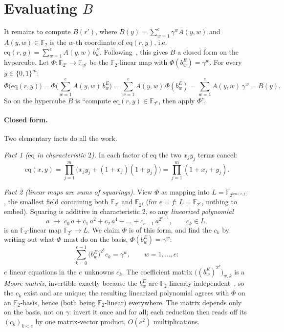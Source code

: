 \documentclass[11pt]{article}
\newcommand{\F}{\mathbb{F}}
\newcommand{\eq}{\mathrm{eq}}
\begin{document}
\section*{Evaluating $B$}
\label{section:eval_B}

It remains to compute $B(r')$, where $B(y)=\sum_{w=1}^e\gamma^w A(y,w)$ and $A(y,w)\in\F_2$ is the $w$-th coordinate of $\eq(r,y)$, i.e.\ $\eq(r,y)=\sum_{w=1}^e A(y,w)\,b^E_w$. Following~\cite{Flock}, this gives $B$ a closed form on the hypercube. Let $\Phi:\F_{2^e}\to\F_{2^f}$ be the $\F_2$-linear map with $\Phi(b^E_w)=\gamma^w$. For every $y\in\{0,1\}^m$:
\[
\Phi\big(\eq(r,y)\big)=\Phi\Big(\sum_{w=1}^e A(y,w)\,b^E_w\Big)=\sum_{w=1}^e A(y,w)\,\Phi(b^E_w)=\sum_{w=1}^e A(y,w)\,\gamma^w=B(y).
\]
So on the hypercube $B$ is ``compute $\eq(r,y)\in\F_{2^e}$, then apply $\Phi$''.

\paragraph{Closed form.} Two elementary facts do all the work.

\emph{Fact 1 ($\eq$ in characteristic $2$).} In each factor of $\eq$ the two $x_jy_j$ terms cancel:
\[
\eq(x,y)=\prod_{j=1}^m\bigl(x_jy_j+(1+x_j)(1+y_j)\bigr)=\prod_{j=1}^m(1+x_j+y_j).
\]

\emph{Fact 2 (linear maps are sums of squarings).} View $\Phi$ as mapping into $L=\F_{2^{\mathrm{lcm}(e,f)}}$, the smallest field containing both $\F_{2^e}$ and $\F_{2^f}$ (for $e=f$: $L=\F_{2^e}$, nothing to embed). Squaring is additive in characteristic $2$, so any \emph{linearized polynomial}~\cite{WikiLinPoly}
\[
a\;\mapsto\;c_0\,a+c_1\,a^2+c_2\,a^4+\dots+c_{e-1}\,a^{2^{e-1}},\qquad c_k\in L,
\]
is an $\F_2$-linear map $\F_{2^e}\to L$. We claim $\Phi$ is of this form, and find the $c_k$ by writing out what $\Phi$ must do on the basis, $\Phi(b^E_w)=\gamma^w$:
\[
\sum_{k=0}^{e-1}\bigl(b^E_w\bigr)^{2^k}c_k=\gamma^w,\qquad w=1,\dots,e:
\]
$e$ linear equations in the $e$ unknowns $c_k$. The coefficient matrix $\bigl((b^E_w)^{2^k}\bigr)_{w,k}$ is a \emph{Moore matrix}, invertible exactly because the $b^E_w$ are $\F_2$-linearly independent~\cite{WikiMoore}, so the $c_k$ exist and are unique; the resulting linearized polynomial agrees with $\Phi$ on an $\F_2$-basis, hence (both being $\F_2$-linear) everywhere. The matrix depends only on the basis, not on $\gamma$: invert it once and for all; each reduction then reads off its $(c_k)_{k<e}$ by one matrix-vector product, $O(e^2)$ multiplications.
\end{document}
